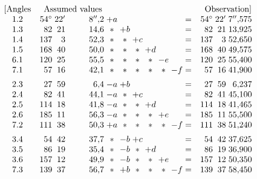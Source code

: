 \[
\begin{array}{@{}c@{\quad}r@{\;}r@{\;}r@{\;}c@{\;}c@{\;}c@{\;}c@{\;}c@{\;}c@{\;}c@{\quad}r@{\;}r@{\;}r@{}}
 [\text{Angles}&\multicolumn{3}{c}{\text{Assumed values}}&&&&&&&&
 \multicolumn{3}{c@{}}{\text{Observation}] }\\
 1.2&54^\circ&22'&8''{,}2&+a&&&&&&=&54^\circ&22'&7''{,}575\\
 1.3&82&21&14{,}6&\ast&+b&&&&&=&82&21&13{,}925\\
 1.4&137&3&52{,}3&\ast&\ast&+c&&&&=&137&3&52{,}650\\
 1.5&168&40&50{,}0&\ast&\ast&\ast&+d&&&=&168&40&49{,}575\\
 6.1&120&25&55{,}5&\ast&\ast&\ast&\ast&-e&&=&120&25&55{,}400\\
 7.1&57&16&42{,}1&\ast&\ast&\ast&\ast&\ast&-f&=&57&16&41{,}900\\[5pt]
 2.3&27&59&6{,}4&-a&+b&&&&&=&27&59&6{,}237\\
 2.4&82&41&44{,}1&-a&\ast&+c&&&&=&82&41&45{,}100\\
 2.5&114&18&41{,}8&-a&\ast&\ast&+d&&&=&114&18&41{,}465\\
 2.6&185&11&56{,}3&-a&\ast&\ast&\ast&+e&&=&185&11&55{,}500\\
 7.2&111&38&50{,}3&+a&\ast&\ast&\ast&\ast&-f&=&111&38&51{,}240\\[5pt]
 3.4&54&42&37{,}7&\ast&-b&+c&&&&=&54&42&37{,}625\\
 3.5&86&19&35{,}4&\ast&-b&\ast&+d&&&=&86&19&36{,}900\\
 3.6&157&12&49{,}9&\ast&-b&\ast&\ast&+e&&=&157&12&50{,}350\\
 7.3&139&37&56{,}7&\ast&+b&\ast&\ast&\ast&-f&=&139&37&58{,}450
\end{array}
\]

